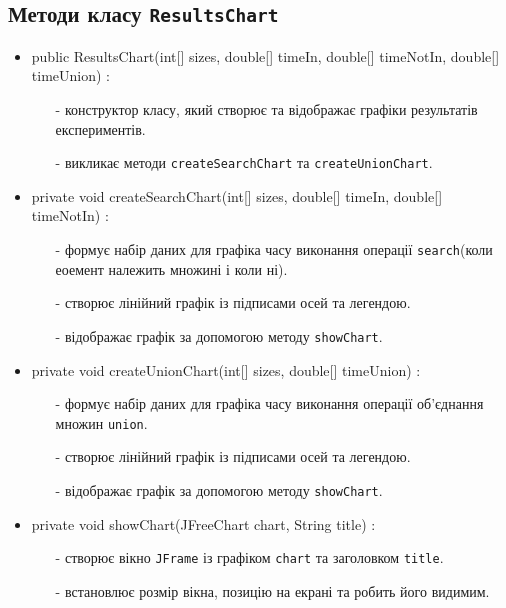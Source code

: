 \documentclass[12pt,a4paper]{article}
\begin{document}
\subsection{Методи класу \texttt{ResultsChart }}
\begin{itemize}
    \item public ResultsChart(int[] sizes, double[] timeIn, double[] timeNotIn, double[] timeUnion) :
    \begin{itemize}
        \item[-] конструктор класу, який створює та відображає графіки результатів експериментів.  
        \item[-] викликає методи \texttt{createSearchChart} та \texttt{createUnionChart}.
    \end{itemize}

    \item private void createSearchChart(int[] sizes, double[] timeIn, double[] timeNotIn) :
    \begin{itemize}
        \item[-] формує набір даних для графіка часу виконання операції \texttt{search}(коли еоемент належить  множині і коли ні).  
        \item[-] створює лінійний графік із підписами осей та легендою.  
        \item[-] відображає графік за допомогою методу \texttt{showChart}.
    \end{itemize}

    \item private void createUnionChart(int[] sizes, double[] timeUnion) :
    \begin{itemize}
        \item[-] формує набір даних для графіка часу виконання операції об'єднання множин \texttt{union}.  
        \item[-] створює лінійний графік із підписами осей та легендою.  
        \item[-] відображає графік за допомогою методу \texttt{showChart}.
    \end{itemize}

    \item private void showChart(JFreeChart chart, String title) :
    \begin{itemize}
        \item[-] створює вікно \texttt{JFrame} із графіком \texttt{chart} та заголовком \texttt{title}.  
        \item[-] встановлює розмір вікна, позицію на екрані та робить його видимим.
    \end{itemize}
\end{itemize}
\end{document}
